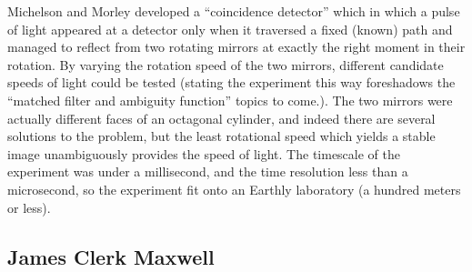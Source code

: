 Michelson and Morley developed a ``coincidence detector'' which in
which a pulse of light appeared at a detector only when it traversed a
fixed (known) path and managed to reflect from two rotating mirrors at
exactly the right moment in their rotation.  By varying the rotation
speed of the two mirrors, different candidate speeds of light could be
tested (stating the experiment this way foreshadows the ``matched
filter and ambiguity function'' topics to come.).  The two mirrors
were actually different faces of an octagonal cylinder, and indeed
there are several solutions to the problem, but the least rotational
speed which yields a stable image unambiguously provides the speed of
light.  The timescale of the experiment was under a millisecond, and
the time resolution less than a microsecond, so the experiment fit
onto an Earthly laboratory (a hundred meters or less).

\subsection{James Clerk Maxwell}

